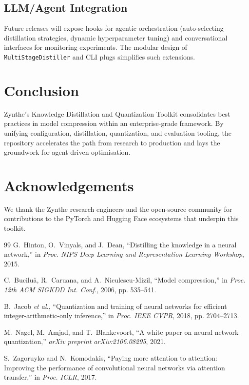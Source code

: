 \documentclass[conference]{IEEEtran}
\begin{document}
\subsection{LLM/Agent Integration}
Future releases will expose hooks for agentic orchestration (auto-selecting distillation strategies, dynamic hyperparameter tuning) and conversational interfaces for monitoring experiments. The modular design of \texttt{MultiStageDistiller} and CLI plugs simplifies such extensions.

\section{Conclusion}
Zynthe's Knowledge Distillation and Quantization Toolkit consolidates best practices in model compression within an enterprise-grade framework. By unifying configuration, distillation, quantization, and evaluation tooling, the repository accelerates the path from research to production and lays the groundwork for agent-driven optimisation.

\section*{Acknowledgements}
We thank the Zynthe research engineers and the open-source community for contributions to the PyTorch and Hugging Face ecosystems that underpin this toolkit.

\begin{thebibliography}{99}
 G.~Hinton, O.~Vinyals, and J.~Dean, ``Distilling the knowledge in a neural network,'' in \emph{Proc. NIPS Deep Learning and Representation Learning Workshop}, 2015.

 C.~Bucilu\u{a}, R.~Caruana, and A.~Niculescu-Mizil, ``Model compression,'' in \emph{Proc. 12th ACM SIGKDD Int. Conf.}, 2006, pp. 535--541.

 B.~Jacob \emph{et al.}, ``Quantization and training of neural networks for efficient integer-arithmetic-only inference,'' in \emph{Proc. IEEE CVPR}, 2018, pp. 2704--2713.

 M.~Nagel, M.~Amjad, and T.~Blankevoort, ``A white paper on neural network quantization,'' \emph{arXiv preprint arXiv:2106.08295}, 2021.

 S.~Zagoruyko and N.~Komodakis, ``Paying more attention to attention: Improving the performance of convolutional neural networks via attention transfer,'' in \emph{Proc. ICLR}, 2017.
\end{thebibliography}
\end{document}
